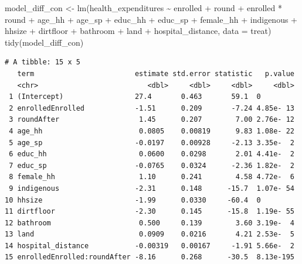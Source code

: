 \documentclass[
  letterpaper,
  DIV=11,
  numbers=noendperiod]{scrartcl}
\newenvironment{Shaded}{\begin{snugshade}}{\end{snugshade}}
\newcommand{\AttributeTok}[1]{\textcolor[rgb]{0.40,0.45,0.13}{#1}}
\newcommand{\FunctionTok}[1]{\textcolor[rgb]{0.28,0.35,0.67}{#1}}
\newcommand{\NormalTok}[1]{\textcolor[rgb]{0.00,0.23,0.31}{#1}}
\newcommand{\OtherTok}[1]{\textcolor[rgb]{0.00,0.23,0.31}{#1}}
\newcommand{\SpecialCharTok}[1]{\textcolor[rgb]{0.37,0.37,0.37}{#1}}
\begin{document}
\begin{Shaded}
\begin{Highlighting}[numbers=left,,]
\NormalTok{model\_diff\_con }\OtherTok{\textless{}{-}} \FunctionTok{lm}\NormalTok{(health\_expenditures }\SpecialCharTok{\textasciitilde{}}\NormalTok{ enrolled }\SpecialCharTok{+}\NormalTok{ round }\SpecialCharTok{+}\NormalTok{ enrolled }\SpecialCharTok{*}\NormalTok{ round }\SpecialCharTok{+} 
\NormalTok{                       age\_hh }\SpecialCharTok{+}\NormalTok{ age\_sp }\SpecialCharTok{+}\NormalTok{ educ\_hh }\SpecialCharTok{+}\NormalTok{ educ\_sp }\SpecialCharTok{+}\NormalTok{ female\_hh }\SpecialCharTok{+}\NormalTok{ indigenous }\SpecialCharTok{+} 
\NormalTok{                       hhsize }\SpecialCharTok{+}\NormalTok{ dirtfloor }\SpecialCharTok{+}\NormalTok{ bathroom }\SpecialCharTok{+}\NormalTok{ land }\SpecialCharTok{+}\NormalTok{ hospital\_distance,}
                 \AttributeTok{data =}\NormalTok{ treat)}
\FunctionTok{tidy}\NormalTok{(model\_diff\_con)}
\end{Highlighting}
\end{Shaded}

\begin{verbatim}
# A tibble: 15 x 5
   term                        estimate std.error statistic   p.value
   <chr>                          <dbl>     <dbl>     <dbl>     <dbl>
 1 (Intercept)                 27.4       0.463       59.1  0        
 2 enrolledEnrolled            -1.51      0.209       -7.24 4.85e- 13
 3 roundAfter                   1.45      0.207        7.00 2.76e- 12
 4 age_hh                       0.0805    0.00819      9.83 1.08e- 22
 5 age_sp                      -0.0197    0.00928     -2.13 3.35e-  2
 6 educ_hh                      0.0600    0.0298       2.01 4.41e-  2
 7 educ_sp                     -0.0765    0.0324      -2.36 1.82e-  2
 8 female_hh                    1.10      0.241        4.58 4.72e-  6
 9 indigenous                  -2.31      0.148      -15.7  1.07e- 54
10 hhsize                      -1.99      0.0330     -60.4  0        
11 dirtfloor                   -2.30      0.145      -15.8  1.19e- 55
12 bathroom                     0.500     0.139        3.60 3.19e-  4
13 land                         0.0909    0.0216       4.21 2.53e-  5
14 hospital_distance           -0.00319   0.00167     -1.91 5.66e-  2
15 enrolledEnrolled:roundAfter -8.16      0.268      -30.5  8.13e-195
\end{verbatim}
\end{document}

